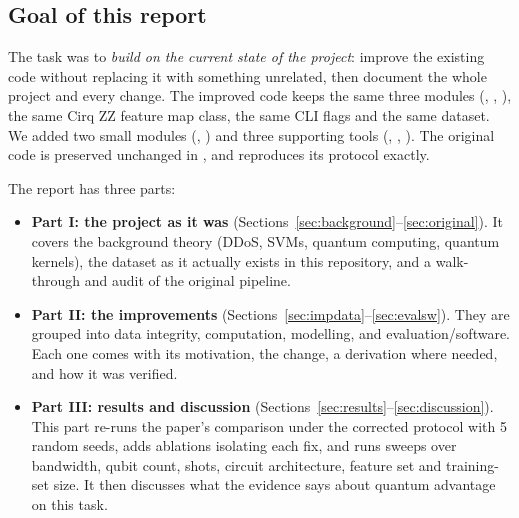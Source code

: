 \subsection{Goal of this report}
The task was to \emph{build on the current state of the project}: improve the existing code
without replacing it with something unrelated, then document the whole project and every change.
The improved code keeps the same three modules (, ,
), the same Cirq ZZ feature map class, the same CLI flags and the same dataset. We
added two small modules (, ) and three supporting
tools (, , ). The original code is preserved
unchanged in , and  reproduces its protocol exactly.

The report has three parts:
\begin{itemize}
  \item \textbf{Part I: the project as it was} (Sections~\ref{sec:background}--\ref{sec:original}).
        It covers the background theory (DDoS, SVMs, quantum computing, quantum kernels), the
        dataset as it actually exists in this repository, and a walk-through and audit of the
        original pipeline.
  \item \textbf{Part II: the improvements} (Sections~\ref{sec:impdata}--\ref{sec:evalsw}).
        They are grouped into data integrity, computation, modelling, and evaluation/software.
        Each one comes with its motivation, the change, a derivation where needed, and how it was
        verified.
  \item \textbf{Part III: results and discussion} (Sections~\ref{sec:results}--\ref{sec:discussion}).
        This part re-runs the paper's comparison under the corrected protocol with 5 random seeds,
        adds ablations isolating each fix, and runs sweeps over bandwidth, qubit count, shots,
        circuit architecture, feature set and training-set size. It then discusses what the
        evidence says about quantum advantage on this task.
\end{itemize}

